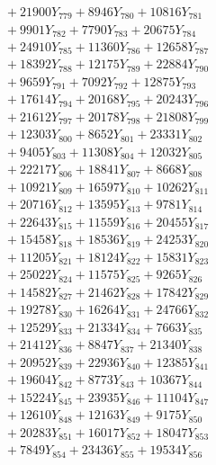 \documentclass[a4paper,10pt]{article}
\begin{document}
{\begin{align}
&\;  + 21900 Y_{779} + 8946 Y_{780} + 10816 Y_{781} \\[0.3ex]
&\;  + 9901 Y_{782} + 7790 Y_{783} + 20675 Y_{784} \\[0.3ex]
&\;  + 24910 Y_{785} + 11360 Y_{786} + 12658 Y_{787} \\[0.3ex]
&\;  + 18392 Y_{788} + 12175 Y_{789} + 22884 Y_{790} \\[0.3ex]
&\;  + 9659 Y_{791} + 7092 Y_{792} + 12875 Y_{793} \\[0.3ex]
&\;  + 17614 Y_{794} + 20168 Y_{795} + 20243 Y_{796} \\[0.3ex]
&\;  + 21612 Y_{797} + 20178 Y_{798} + 21808 Y_{799} \\[0.3ex]
&\;  + 12303 Y_{800} + 8652 Y_{801} + 23331 Y_{802} \\[0.3ex]
&\;  + 9405 Y_{803} + 11308 Y_{804} + 12032 Y_{805} \\[0.3ex]
&\;  + 22217 Y_{806} + 18841 Y_{807} + 8668 Y_{808} \\[0.5ex]\allowbreak
&\;  + 10921 Y_{809} + 16597 Y_{810} + 10262 Y_{811} \\[0.3ex]
&\;  + 20716 Y_{812} + 13595 Y_{813} + 9781 Y_{814} \\[0.3ex]
&\;  + 22643 Y_{815} + 11559 Y_{816} + 20455 Y_{817} \\[0.3ex]
&\;  + 15458 Y_{818} + 18536 Y_{819} + 24253 Y_{820} \\[0.3ex]
&\;  + 11205 Y_{821} + 18124 Y_{822} + 15831 Y_{823} \\[0.3ex]
&\;  + 25022 Y_{824} + 11575 Y_{825} + 9265 Y_{826} \\[0.3ex]
&\;  + 14582 Y_{827} + 21462 Y_{828} + 17842 Y_{829} \\[0.3ex]
&\;  + 19278 Y_{830} + 16264 Y_{831} + 24766 Y_{832} \\[0.3ex]
&\;  + 12529 Y_{833} + 21334 Y_{834} + 7663 Y_{835} \\[0.3ex]
&\;  + 21412 Y_{836} + 8847 Y_{837} + 21340 Y_{838} \\[0.5ex]\allowbreak
&\;  + 20952 Y_{839} + 22936 Y_{840} + 12385 Y_{841} \\[0.3ex]
&\;  + 19604 Y_{842} + 8773 Y_{843} + 10367 Y_{844} \\[0.3ex]
&\;  + 15224 Y_{845} + 23935 Y_{846} + 11104 Y_{847} \\[0.3ex]
&\;  + 12610 Y_{848} + 12163 Y_{849} + 9175 Y_{850} \\[0.3ex]
&\;  + 20283 Y_{851} + 16017 Y_{852} + 18047 Y_{853} \\[0.3ex]
&\;  + 7849 Y_{854} + 23436 Y_{855} + 19534 Y_{856} \\[0.3ex]

\end{align}}
\end{document}
